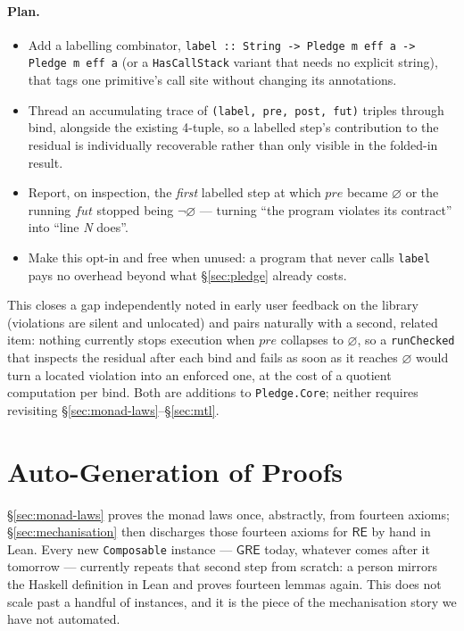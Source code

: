 \documentclass[acmsmall,screen]{acmart}
\newcommand{\RE}{\mathsf{RE}}
\newcommand{\GRE}{\mathsf{GRE}}
\newcommand{\pre}{\mathit{pre}}
\newcommand{\fut}{\mathit{fut}}
\newcommand{\univ}{\neg\varnothing}
\begin{document}
\paragraph{Plan.}
\begin{itemize}[wide, labelindent=10pt]
  \item Add a labelling combinator,
        \lstinline{label :: String -> Pledge m eff a -> Pledge m eff a}
        (or a \lstinline{HasCallStack} variant that needs no explicit
        string), that tags one primitive's call site without changing its
        annotations.
  \item Thread an accumulating trace of \lstinline{(label, pre, post, fut)}
        triples through bind, alongside the existing 4-tuple, so a
        labelled step's contribution to the residual is individually
        recoverable rather than only visible in the folded-in result.
  \item Report, on inspection, the \emph{first} labelled step at which
        $\pre$ became $\varnothing$ or the running $\fut$ stopped being
        $\univ$ --- turning ``the program violates its contract'' into
        ``line \emph{N} does''.
  \item Make this opt-in and free when unused: a program that never calls
        \lstinline{label} pays no overhead beyond what \S\ref{sec:pledge}
        already costs.
\end{itemize}
This closes a gap independently noted in early user feedback on the
library (violations are silent and unlocated) and pairs naturally with a
second, related item: nothing currently stops execution when $\pre$
collapses to $\varnothing$, so a \lstinline{runChecked} that inspects the
residual after each bind and fails as soon as it reaches $\varnothing$
would turn a located violation into an enforced one, at the cost of a
quotient computation per bind.
Both are additions to \lstinline{Pledge.Core}; neither requires revisiting
\S\ref{sec:monad-laws}--\S\ref{sec:mtl}.

\section{Auto-Generation of Proofs}
\label{sec:proof-gen}

\S\ref{sec:monad-laws} proves the monad laws once, abstractly, from fourteen
axioms; \S\ref{sec:mechanisation} then discharges those fourteen axioms for
$\RE$ by hand in Lean.
Every new \lstinline{Composable} instance --- $\GRE$ today, whatever comes
after it tomorrow --- currently repeats that second step from scratch: a
person mirrors the Haskell definition in Lean and proves fourteen lemmas
again.
This does not scale past a handful of instances, and it is the piece of the
mechanisation story we have not automated.
\end{document}
